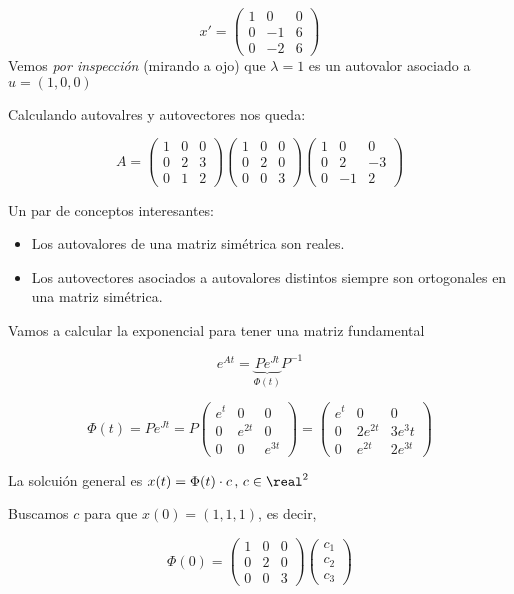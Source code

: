 \documentclass[nochap]{apuntes}
\begin{document}
\begin{problem}[26]
\[x'=\begin{pmatrix}
1&0&0\\0&-1&6\\0&-2&6
\end{pmatrix}\]
\solution
Vemos \textit{por inspección} (mirando a ojo) que $\lambda=1$ es un autovalor asociado a $u=(1,0,0)$

Calculando autovalres y autovectores nos queda:

\[A=\begin{pmatrix}
1&0&0\\0&2&3\\0&1&2
\end{pmatrix}\begin{pmatrix}
1&0&0\\0&2&0\\0&0&3
\end{pmatrix}\begin{pmatrix}
1&0&0\\0&2&-3\\0&-1&2
\end{pmatrix}\]

Un par de conceptos interesantes:

\begin{itemize}
\item Los autovalores de una matriz simétrica son reales.
\item Los autovectores asociados a autovalores distintos siempre son ortogonales en una matriz simétrica.
\end{itemize}
Vamos a calcular la exponencial para tener una matriz fundamental

\[e^{At} = \underbrace{Pe^{Jt}}_{\Phi(t)}P^{-1}\]

\[\Phi(t) = Pe^{Jt} = P \begin{pmatrix}
e^t&0&0\\0&e^{2t}&0\\0&0&e^{3t}
\end{pmatrix} = 
\begin{pmatrix}
e^t&0&0\\0&2e^{2t}&3e^3t\\0&e^{2t} &2e^{3t}
\end{pmatrix}\]

La solcuión general es $x(t) = \Phi(t) \cdot c\,,\,c\in\real^2$

Buscamos $c$ para que $x(0) = (1,1,1)$, es decir,

\[\Phi(0) = \begin{pmatrix}
1&0&0\\0&2&0\\0&0&3
\end{pmatrix} \begin{pmatrix}
c_1\\c_2\\c_3
\end{pmatrix}\]


\end{problem}
\end{document}

